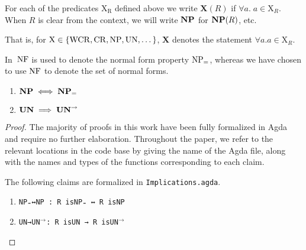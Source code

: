 
\begin{notation}
    For each of the predicates $\mathrm{X_R}$ defined above we write
    $\mathbf{X}(R)$ if $\forall a.\; a \in \mathrm{X}_R$. When $R$ is clear from the context, we will write $\mathbf{NP}$ for $\mathbf{NP}(R)$, etc.

    That is, for $\mathrm{X} \in \{\mathrm{WCR} , \mathrm{CR} , \mathrm{NP} , \mathrm{UN}, \dots \}$, $\mathbf{X}$ denotes the statement $\forall a. a \in \mathrm{X}_R$.
\end{notation}


In \terese $\,\mathrm{NF}$ is used to denote the normal form property $\mathrm{NP_=}$, whereas we have chosen to use $\mathrm{NF}$ to denote the set of normal forms.

\begin{proposition}\hfill
    \begin{enumerate}
        \item $\mathbf{NP} \iff \mathbf{NP_=}$
        \item $\mathbf{UN} \implies \mathbf{UN}^{\to}$
    \end{enumerate}
\end{proposition}
\begin{proof} The majority of proofs in this work have been fully formalized in Agda and require no further elaboration.  Throughout the paper, we refer to the relevant locations in the code base by giving the name of the Agda file, along with the names and types of the functions corresponding to each claim.

  The following claims are formalized in \texttt{Implications.agda}.
    \begin{enumerate}
        \item \verb|NP₌↔NP : R isNP₌ ↔ R isNP|
        \item \verb|UN→|\texttt{UN}$^{\to}$\verb|: R isUN → R is|\texttt{UN}$^{\to}$ \qedhere
    \end{enumerate}
\end{proof}

